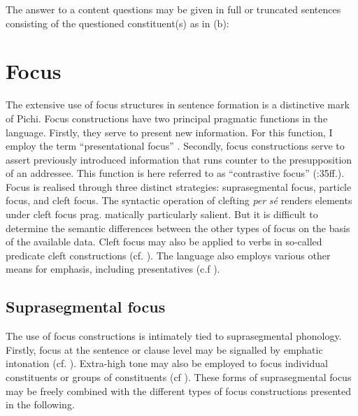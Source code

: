 The answer to a content questions may be given in full or truncated sentences consisting of the questioned constituent(s) as in (b): 


\ea%
    \label{ex:key:661}
\z
\z

\section{Focus}\label{sec:7.4}

The extensive use of focus structures in sentence formation is a distinctive mark of Pichi. Focus constructions have two principal pragmatic functions in the language. Firstly, they serve to present new information. For this function, I employ the term “presentational focus” \citep{Drubig2003}. Secondly, focus constructions serve to assert previously introduced information that runs counter to the presupposition of an addressee. This function is here referred to as “contrastive focus” (\citealt{Chafe1976}:35ff.). Focus is realised through three distinct strategies: suprasegmental focus, particle focus, and cleft focus. The syntactic operation of clefting \textit{per} \textit{sé} renders elements under cleft focus prag. matically particularly salient. But it is difficult to determine the semantic differences between the other types of focus on the basis of the available data. Cleft focus may also be applied to verbs in so-called predicate cleft constructions (cf. ). The language also employs various other means for emphasis, including presentatives (c.f ).

\subsection{Suprasegmental focus}

The use of focus constructions is intimately tied to suprasegmental phonology. Firstly, focus at the sentence or clause level may be signalled by emphatic intonation (cf. ). Extra-high tone may also be employed to focus individual constituents or groups of constituents (cf ). These forms of suprasegmental focus may be freely combined with the different types of focus constructions presented in the following. 

